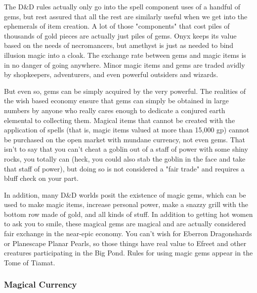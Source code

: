 The D\&D rules actually only go into the spell component uses of a handful of gems, but rest assured that all the rest are similarly useful when we get into the ephemerals of item creation. A lot of those "components" that cost piles of thousands of gold pieces are actually just piles of gems. Onyx keeps its value based on the needs of necromancers, but amethyst is just as needed to bind illusion magic into a cloak. The exchange rate between gems and magic items is in no danger of going anywhere. Minor magic items and gems are traded avidly by shopkeepers, adventurers, and even powerful outsiders and wizards.

But even so, gems can be simply acquired by the very powerful. The realities of the wish based economy ensure that gems can simply be obtained in large numbers by anyone who really cares enough to dedicate a conjured earth elemental to collecting them. Magical items that cannot be created with the application of spells (that is, magic items valued at more than 15,000 gp) cannot be purchased on the open market with mundane currency, not even gems. That isn't to say that you can't cheat a goblin out of a staff of power with some shiny rocks, you totally can (heck, you could also stab the goblin in the face and take that staff of power), but doing so is not considered a "fair trade" and requires a bluff check on your part.

In addition, many D\&D worlds posit the existence of magic gems, which can be used to make magic items, increase personal power, make a snazzy grill with the bottom row made of gold, and all kinds of stuff. In addition to getting hot women to ask you to smile, these magical gems are magical and are actually considered fair exchange in the near-epic economy. You can't wish for Eberron Dragonshards or Planescape Planar Pearls, so those things have real value to Efreet and other creatures participating in the Big Pond. Rules for using magic gems appear in the Tome of Tiamat.

\subsubsection{Magical Currency}

\listone


